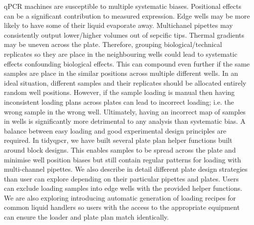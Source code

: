 \documentclass{SBCbookchapter}
\begin{document}
qPCR machines are susceptible to multiple systematic biases. Positional effects can be a significant contribution to measured expression. Edge wells may be more likely to have some of their liquid evaporate away. Multichanel pipettes may consistently output lower/higher volumes out of sepcific tips. Thermal gradients may be uneven across the plate. Therefore, grouping biological/technical replicates so they are place in the neighbouring wells could lead to systematic effects confounding biological effects. This can compound even further if the same samples are place in the similar positions across multiple different wells. In an ideal situation, different samples and their replicates should be allocated entirely random well positions. However, if the sample loading is manual then having inconsistent loading plans across plates can lead to incorrect loading; i.e. the wrong sample in the wrong well. Ultimately, having an incorrect map of samples in wells is significantly more detrimental to any analysis than systematic bias. A balance between easy loading and good experimental design principles are required. In tidyqpcr, we have built several plate plan helper functions built around block designs. This enables samples to be spread across the plate and minimise well position biases but still contain regular patterns for loading with multi-channel pipettes. We also describe in detail different plate design strategies than user can explore depending on their particular pipettes and plates. Users can exclude loading samples into edge wells with the provided helper functions. We are also exploring introducing automatic generation of loading recipes for common liquid handlers so users with the access to the appropriate equipment can ensure the loader and plate plan match identically.


\end{document}
